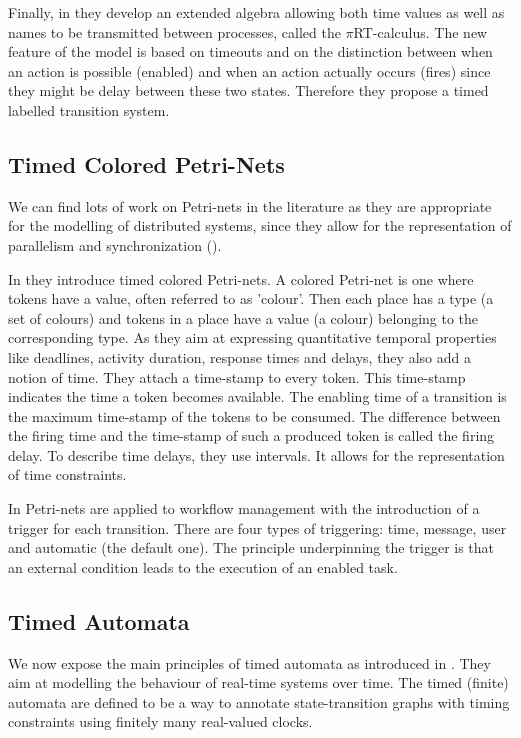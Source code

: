 \documentclass[a4paper,11pt,twoside]{report}
\begin{document}
Finally, in \cite{lee2002modeling} they develop an extended algebra allowing both time values as well as names to be transmitted between processes, called the $\pi$RT-calculus. The new feature of the model is based on timeouts and on the distinction between when an action is possible (enabled) and when an action actually occurs (fires) since they might be delay between these two states. Therefore they propose a timed labelled transition system. 


\subsection{Timed Colored Petri-Nets}
We can find lots of work on Petri-nets in the literature as they are appropriate for the modelling of distributed systems, since they allow for the representation of parallelism and synchronization (\cite{vanderaalst1992timed,desel1995free}).

In \cite{vanderaalst1992timed} they introduce timed colored Petri-nets. A colored Petri-net is one where tokens have a value, often referred to as 'colour'. Then each place has a type (a set of colours) and tokens in a place have a value (a colour) belonging to the corresponding type. As they aim at expressing quantitative temporal properties like deadlines, activity duration, response times and delays, they also add a notion of time. They attach a time-stamp to every token. This time-stamp indicates the time a token becomes available. The enabling time of a transition is the maximum time-stamp of the tokens to be consumed. The difference between the firing time and the time-stamp of such a produced token is called the firing delay. To describe time delays, they use intervals. It allows for the representation of time constraints.

In \cite{van1998application} Petri-nets are applied to workflow management with the introduction of a trigger for each transition. There are four types of triggering: time, message, user and automatic (the default one). The principle underpinning the trigger is that an external condition leads to the execution of an enabled task.



\subsection{Timed Automata}
We now expose the main principles of timed automata as introduced in \cite{alur1994theory,alur1999timed,bengtsson2004timed}. They aim at modelling the behaviour of real-time systems over time. The timed (finite) automata are defined to be a way to annotate state-transition graphs with timing constraints using finitely many real-valued clocks.
\end{document}
